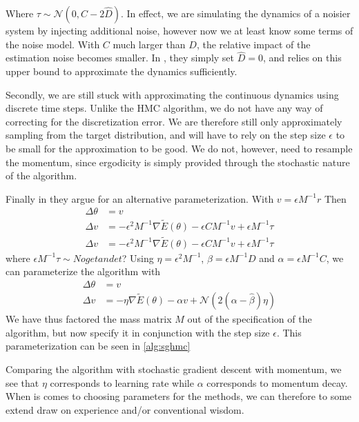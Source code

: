 Where $\tau\sim  \mathcal{N}(0, C - 2\hat{D})$.
In effect, we are simulating the dynamics of a noisier system by injecting additional noise, however now we at least know some terms of the noise model.
With $C$ much larger than $D$, the relative impact of the estimation noise becomes smaller. 
In \cite{chen_stochastic_2014}, they simply set $\hat{D} = 0$, and relies on this upper bound to approximate the dynamics sufficiently.  

Secondly, we are still stuck with approximating the continuous dynamics using discrete time steps.
Unlike the HMC algorithm, we do not have any way of correcting for the discretization error. 
We are therefore still only approximately sampling from the target distribution, and will have to rely on the step size $\epsilon$ to be small for the approximation to be good.
We do not, however, need to resample the momentum, since ergodicity is simply provided through the stochastic nature of the algorithm.

Finally in \cite{chen_stochastic_2014} they argue for an alternative parameterization.
With $v = \epsilon M^{-1} r$ Then
\begin{align}
    \Delta \theta &=  v \\
    \Delta v &=  -\epsilon^2 M^{-1} \nabla\tilde{E}(\theta) - \epsilon CM^{-1}v  + \epsilon M^{-1}\tau \\
    \Delta v &=  -\epsilon^2 M^{-1} \nabla\tilde{E}(\theta) - \epsilon CM^{-1}v  + \epsilon M^{-1}\tau
\end{align}
where $\epsilon M^{-1}\tau\sim Noget andet$? Using $\eta = \epsilon^2M^{-1}$, $\beta = \epsilon M^{-1} D$ and $\alpha = \epsilon M^{-1}C$, we can parameterize the algorithm with
\begin{align}
    \Delta \theta &=  v \\
    \Delta v &=  -\eta \nabla\tilde{E}(\theta) - \alpha v  + \mathcal{N}(2(\alpha-\hat{\beta})\eta)
\end{align}
We have thus factored the mass matrix $M$ out of the specification of the algorithm, but now specify it in conjunction with the step size $\epsilon$. 
This parameterization can be seen in \cref{alg:sghmc}

Comparing the algorithm with stochastic gradient descent with momentum, we see that  $\eta$ corresponds to learning rate while $\alpha$ corresponds to momentum decay. 
When is comes to choosing parameters for the methods, we can therefore to some extend draw on experience and/or conventional wisdom.

